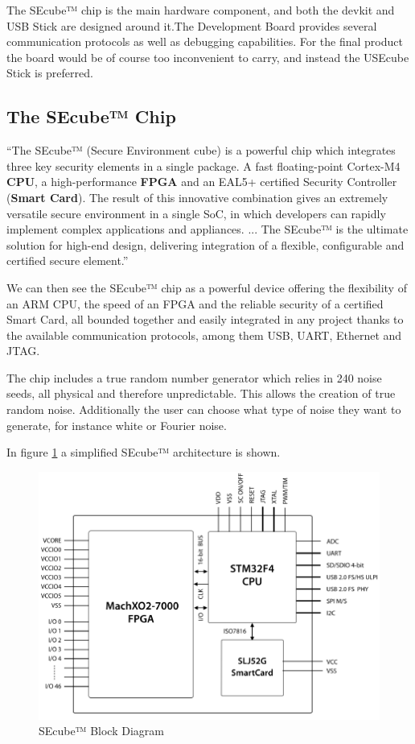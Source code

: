 The SEcube™ chip is the main hardware component, and both the devkit and USB Stick are designed around it.The Development Board provides several communication protocols as well as debugging capabilities. For the final product the board would be of course too inconvenient to carry, and instead the USEcube Stick is preferred.

\subsection{The SEcube™ Chip}

``The SEcube™ (Secure Environment cube) is a powerful chip which
integrates three key security elements in a single package. A fast
floating-point Cortex-M4 \textbf{CPU}, a high-performance \textbf{FPGA} and an
EAL5+ certified Security Controller (\textbf{Smart Card}).
The result of this innovative combination gives an extremely
versatile secure environment in a single SoC, in which developers
can rapidly implement complex applications and appliances.
... The SEcube™ is the ultimate solution for high-end design,
delivering integration of a flexible, configurable and certified
secure element.'' \cite{SEcubeDS}

We can then see the SEcube™ chip as a powerful device offering the flexibility of an \textsc{ARM} CPU, the speed of an FPGA and the reliable security of a certified Smart Card, all bounded together and easily integrated in any project thanks to the available communication protocols, among them USB, UART, Ethernet and JTAG. 

The chip includes a true random number generator which relies in 240 noise seeds, all physical and therefore unpredictable. This allows the creation of true random noise. Additionally the user can choose what type of noise they want to generate, for instance white or Fourier noise.


In figure \ref{fig:SEcubeBD} a simplified SEcube™ architecture is shown.

\begin{figure}[ht]
	\centering
	\includegraphics[width=\textwidth]{chapters/figures/development/SEcubeBlocks.png}
	\caption{SEcube™ Block Diagram}
	\label{fig:SEcubeBD}
\end{figure}


